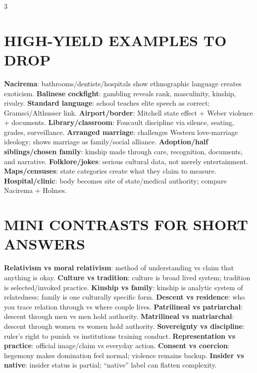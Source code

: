 \documentclass[10pt,landscape]{article}
\newcommand{\kw}[1]{\textbf{#1}}
\begin{document}
\begin{multicols}{3}
\section*{HIGH-YIELD EXAMPLES TO DROP}
\kw{Nacirema}: bathrooms/dentists/hospitals show ethnographic language creates exoticism. \kw{Balinese cockfight}: gambling reveals rank, masculinity, kinship, rivalry. \kw{Standard language}: school teaches elite speech as correct; Gramsci/Althusser link. \kw{Airport/border}: Mitchell state effect + Weber violence + documents. \kw{Library/classroom}: Foucault discipline via silence, seating, grades, surveillance. \kw{Arranged marriage}: challenges Western love-marriage ideology; shows marriage as family/social alliance. \kw{Adoption/half siblings/chosen family}: kinship made through care, recognition, documents, and narrative. \kw{Folklore/jokes}: serious cultural data, not merely entertainment. \kw{Maps/censuses}: state categories create what they claim to measure. \kw{Hospital/clinic}: body becomes site of state/medical authority; compare Nacirema + Holmes.

\section*{MINI CONTRASTS FOR SHORT ANSWERS}
\kw{Relativism vs moral relativism}: method of understanding vs claim that anything is okay. \kw{Culture vs tradition}: culture is broad lived system; tradition is selected/invoked practice. \kw{Kinship vs family}: kinship is analytic system of relatedness; family is one culturally specific form. \kw{Descent vs residence}: who you trace relation through vs where couple lives. \kw{Patrilineal vs patriarchal}: descent through men vs men hold authority. \kw{Matrilineal vs matriarchal}: descent through women vs women hold authority. \kw{Sovereignty vs discipline}: ruler's right to punish vs institutions training conduct. \kw{Representation vs practice}: official image/claim vs everyday action. \kw{Consent vs coercion}: hegemony makes domination feel normal; violence remains backup. \kw{Insider vs native}: insider status is partial; ``native'' label can flatten complexity.

\end{multicols}
\newpage
\end{document}
